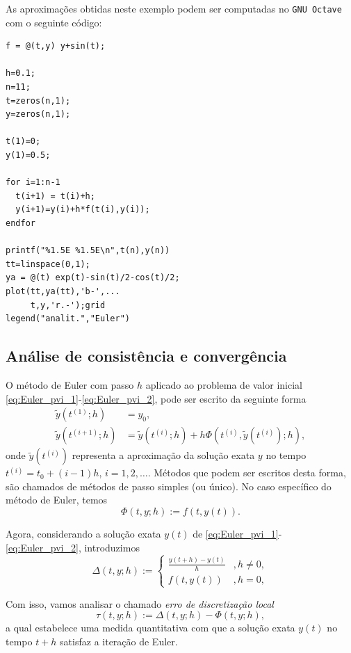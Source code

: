 \begin{ex}
\ifisoctave
As aproximações obtidas neste exemplo podem ser computadas no \verb+GNU Octave+ com o seguinte código:
\begin{verbatim}
f = @(t,y) y+sin(t);

h=0.1;
n=11;
t=zeros(n,1);
y=zeros(n,1);

t(1)=0;
y(1)=0.5;

for i=1:n-1
  t(i+1) = t(i)+h;
  y(i+1)=y(i)+h*f(t(i),y(i));
endfor

printf("%1.5E %1.5E\n",t(n),y(n))
tt=linspace(0,1);
ya = @(t) exp(t)-sin(t)/2-cos(t)/2;
plot(tt,ya(tt),'b-',...
     t,y,'r.-');grid
legend("analit.","Euler")
\end{verbatim}
\fi
\end{ex}

\subsection{Análise de consistência e convergência}

O método de Euler com passo $h$ aplicado ao problema de valor inicial \eqref{eq:Euler_pvi_1}-\eqref{eq:Euler_pvi_2}, pode ser escrito da seguinte forma
\begin{align}
  \tilde{y}(t^{(1)};h) &= y_0,\label{eq:MPS_1}\\
  \tilde{y}(t^{(i+1)};h) &= \tilde{y}(t^{(i)};h) + h\Phi(t^{(i)},\tilde{y}(t^{(i)});h),\label{eq:MPS_2}
\end{align}
onde $\tilde{y}(t^{(i)})$ representa a aproximação da solução exata $y$ no tempo $t^{(i)}=t_0+(i-1)h$, $i=1, 2, \ldots$. Métodos que podem ser escritos desta forma, são chamados de métodos de passo simples (ou único). No caso específico do método de Euler, temos
\begin{equation}
  \Phi(t,y;h) := f(t,y(t)).
\end{equation}

Agora, considerando a solução exata $y(t)$ de \eqref{eq:Euler_pvi_1}-\eqref{eq:Euler_pvi_2}, introduzimos
\begin{equation}
  \Delta(t,y;h) := \left\{
    \begin{array}{ll}
      \frac{y(t+h)-y(t)}{h} &, h\neq 0,\\
      f(t,y(t)) &, h=0,
    \end{array}\right.
\end{equation}

Com isso, vamos analisar o chamado \emph{erro de discretização local}
\begin{equation}
  \tau(t,y;h) := \Delta(t,y;h) - \Phi(t,y;h),
\end{equation}
a qual estabelece uma medida quantitativa com que a solução exata $y(t)$ no tempo $t+h$ satisfaz a iteração de Euler.

